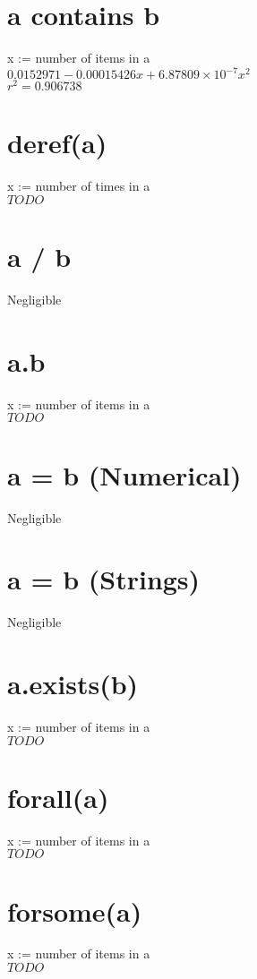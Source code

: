 \documentclass[12pt]{article}
\begin{document}
	\section{a contains b}
	x := number of items in a\\
	$0.0152971 - 0.00015426x + 6.87809 \times 10^{-7} x^2$\\
	$r^2 = 0.906738$
	
	\section{deref(a)}
	x := number of times in a\\
	$TODO$
	
	\section{a / b}
	Negligible
	
	\section{a.b}
	x := number of items in a\\
	$TODO$
	
	\section{a = b (Numerical)}
	Negligible
	
	\section{a = b (Strings)}
	Negligible
	
	\section{a.exists(b)}
	x := number of items in a\\
	$TODO$
	
	\section{forall(a)}
	x := number of items in a\\
	$TODO$
	
	\section{forsome(a)}
	x := number of items in a\\
	$TODO$
	
\end{document}
